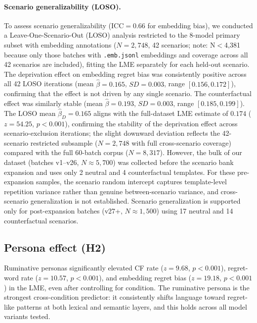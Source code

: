 \documentclass[conference,10pt]{IEEEtran}
\begin{document}
\paragraph{Scenario generalizability (LOSO).}
To assess scenario generalizability (ICC$=0.66$ for embedding bias), we conducted a Leave-One-Scenario-Out (LOSO) analysis restricted to the 8-model primary subset with embedding annotations ($N=2{,}748$, 42 scenarios; note: N$<$4,381 because only those batches with \texttt{.emb.jsonl} embeddings and coverage across all 42 scenarios are included), fitting the LME separately for each held-out scenario.
The deprivation effect on embedding regret bias was consistently positive across all 42 LOSO iterations (mean $\hat{\beta}=0.165$, $SD=0.003$, range $[0.156, 0.172]$), confirming that the effect is not driven by any single scenario. The counterfactual effect was similarly stable (mean $\hat{\beta}=0.193$, $SD=0.003$, range $[0.185, 0.199]$). The LOSO mean $\hat{\beta}_D=0.165$ aligns with the full-dataset LME estimate of $0.174$ ($z=54.25$, $p<0.001$), confirming the stability of the deprivation effect across scenario-exclusion iterations; the slight downward deviation reflects the 42-scenario restricted subsample ($N=2{,}748$ with full cross-scenario coverage) compared with the full 60-batch corpus ($N=8{,}317$).
However, the bulk of our dataset (batches v1--v26, $N\approx5{,}700$) was collected before the scenario bank expansion and uses only 2 neutral and 4 counterfactual templates. For these pre-expansion samples, the scenario random intercept captures template-level repetition variance rather than genuine between-scenario variance, and cross-scenario generalization is not established. Scenario generalization is supported only for post-expansion batches (v27+, $N\approx1{,}500$) using 17 neutral and 14 counterfactual scenarios.

\subsection{Persona effect (H2)}

Ruminative personas significantly elevated CF rate ($z=9.68$, $p<0.001$), regret-word rate ($z=10.57$, $p<0.001$), and embedding regret bias ($z=19.18$, $p<0.001$) in the LME, even after controlling for condition. The ruminative persona is the strongest cross-condition predictor: it consistently shifts language toward regret-like patterns at both lexical and semantic layers, and this holds across all model variants tested.
\end{document}
